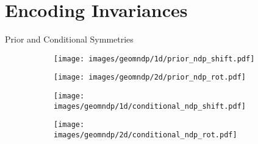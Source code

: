 

\section{Encoding Invariances}

\begin{frame}{Prior and Conditional Symmetries}
    \vspace{-2.5mm} 
    \begin{figure}[t]
    \centering
    \begin{subfigure}[b]{0.45\textwidth}
    \centering
    \texttt{[image: images/geomndp/1d/prior\_ndp\_shift.pdf]}
    \end{subfigure}%
    \hspace{0.3cm}
    \begin{subfigure}[b]{0.45\textwidth}
    \centering
    \texttt{[image: images/geomndp/2d/prior\_ndp\_rot.pdf]}
    \vspace{-.75em}
    \end{subfigure}
    \end{figure}
    \vspace{-6mm} 
    \begin{figure}[t]
    \centering
    \begin{subfigure}[b]{0.45\textwidth}
    \centering
    \texttt{[image: images/geomndp/1d/conditional\_ndp\_shift.pdf]}
    \end{subfigure}%
    \hspace{0.3cm}
    \begin{subfigure}[b]{0.45\textwidth}
    \centering
    \texttt{[image: images/geomndp/2d/conditional\_ndp\_rot.pdf]}
    \vspace{-.75em}
    \end{subfigure}
    \end{figure}
    
\end{frame}



